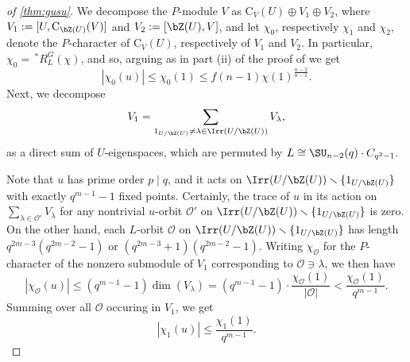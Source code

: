 \documentclass[eqthmnum,nocolour,skinny]{jt-calcs}
\newcommand{\CB}{\mathrm {C}}
\begin{document}
\begin{proof}[of \cref{thm:gusu}]
We decompose the $P$-module $V$ as $\CB_V(U) \oplus V_1 \oplus V_2$, where 
$V_1 := [U,\CB_{\bZ(U)}(V)]$ and $V_2:= [\bZ(U),V]$, and let $\chi_0$, respectively $\chi_1$ and $\chi_2$, denote the $P$-character of
$\CB_V(U)$, respectively of $V_1$ and $V_2$. In particular, $\chi_0 = \,^*R^G_L(\chi)$, and so, arguing as in part (ii) of the proof of
\cite[Thm.~1.4]{bezrukavnikov-liebeck-shalev-tiep:2017:character-bounds-grps-Lie-type}
we get
\begin{equation}\label{su-7}
|\chi_0(u)| \leq \chi_0(1) \leq f(n-1)\chi(1)^{\frac{n-2}{n-1}}.
\end{equation}
Next, we decompose
\begin{equation*}
V_1 = \sum_{1_{U/\bZ(U)} \neq \lambda \in \Irr(U/\bZ(U))}V_\lambda,
\end{equation*}
as a direct sum of $U$-eigenspaces, which are permuted by $L \cong \SU_{n-2}(q) \cdot C_{q^2-1}$.

Note that $u$ has prime order $p \mid q$, and it acts on $\Irr(U/\bZ(U)) \smallsetminus \{1_{U/\bZ(U)} \}$ with exactly $q^{m-1}-1$ fixed points. 
Certainly, the trace of
$u$ in its action on $\sum_{\lambda \in \mathcal{O}'}V_{\lambda}$ for any nontrivial $u$-orbit $\mathcal{O}'$ on $\Irr(U/\bZ(U)) \smallsetminus \{1_{U/\bZ(U)} \}$ is zero. On the other hand, each $L$-orbit $\mathcal{O}$ on $\Irr(U/\bZ(U)) \smallsetminus \{1_{U/\bZ(U)} \}$ has length $q^{2m-3}(q^{2m-2}-1)$ or
$(q^{2m-3}+1)(q^{2m-2}-1)$. Writing $\chi_{\mathcal {O}}$ for the $P$-character of the nonzero submodule of $V_1$ corresponding to 
$\mathcal{O} \ni \lambda$, we then have
\begin{equation*} 
|\chi_{\mathcal{O}}(u)| \leq (q^{m-1}-1)\dim(V_{\lambda}) = (q^{m-1}-1) \cdot \frac{\chi_{\mathcal{O}}(1)}{|\mathcal{O}|} < 
\frac{\chi_{\mathcal{O}}(1)}{q^{m-1}}.
\end{equation*}
Summing over all $\mathcal{O}$ occuring in $V_1$, we get
\begin{equation}\label{su-8}
  |\chi_1(u)| \leq \frac{\chi_1(1)}{q^{m-1}}.
\end{equation}  


\end{proof}
\end{document}
